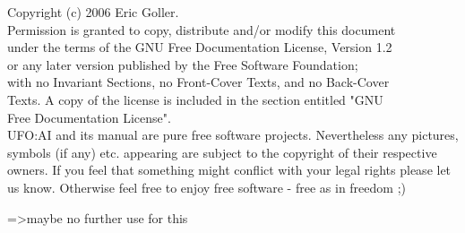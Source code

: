 
%
%





Copyright (c)  2006 Eric Goller.\\
Permission is granted to copy, distribute and/or modify this document\\
under the terms of the GNU Free Documentation License, Version 1.2\\
or any later version published by the Free Software Foundation;\\
with no Invariant Sections, no Front-Cover Texts, and no Back-Cover\\
Texts.  A copy of the license is included in the section entitled "GNU\\
Free Documentation License".\\

UFO:AI and its manual are pure free software projects. Nevertheless any pictures, symbols (if any) etc. appearing are subject to the copyright of their respective owners. If you feel that something might conflict with your legal rights please let us know. Otherwise feel free to enjoy free software - free as in freedom ;) 

\maketitle
\newpage
%
\tableofcontents



     				=>maybe no further use for this
\appendix





